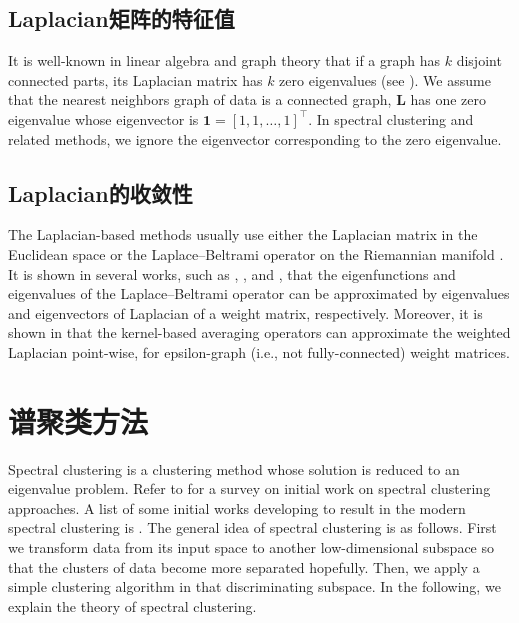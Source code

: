 \documentclass[lang=cn,10pt]{gorgeousnbook}
\numberwithin{equation}{section}%
\numberwithin{figure}{section}%
\begin{document}
\subsection{Laplacian矩阵的特征值}\label{section_eig_Laplacian}

It is well-known in linear algebra and graph theory that if a graph has $k$ disjoint connected parts, its Laplacian matrix has $k$ zero eigenvalues (see \cite{polito2002grouping,ahmadizadeh2017eigenvalues}).
We assume that the nearest neighbors graph of data is a connected graph, $\boldsymbol{L}$ has one zero eigenvalue whose eigenvector is $\boldsymbol{1} = [1, 1, \dots, 1]^\top$. In spectral clustering and related methods, we ignore the eigenvector corresponding to the zero eigenvalue. 

\subsection{Laplacian的收敛性}

The Laplacian-based methods usually use either the Laplacian matrix in the Euclidean space or the Laplace--Beltrami operator on the Riemannian manifold \cite{hein2005graphs}. 
It is shown in several works, such as \cite{burago2015graph}, \cite{trillos2020error}, and \cite{dunson2021spectral}, that the eigenfunctions and eigenvalues of the Laplace--Beltrami operator can be approximated by eigenvalues and eigenvectors of Laplacian of a weight matrix, respectively. 
Moreover, it is shown in \cite{hein2005graphs,hein2007graph} that the kernel-based averaging operators can approximate the weighted Laplacian point-wise, for epsilon-graph (i.e., not fully-connected) weight matrices. 

\section{谱聚类方法}\label{section_spectral_clustering}

Spectral clustering \cite{weiss1999segmentation,ng2001spectral} is a clustering method whose solution is reduced to an eigenvalue problem. Refer to \cite{weiss1999segmentation} for a survey on initial work on spectral clustering approaches. A list of some initial works developing to result in the modern spectral clustering is \cite{scott1990feature,costeira1995multi,perona1998factorization,shi1997normalized,shi2000normalized}.
The general idea of spectral clustering is as follows. First we transform data from its input space to another low-dimensional subspace so that the clusters of data become more separated hopefully. Then, we apply a simple clustering algorithm in that discriminating subspace. In the following, we explain the theory of spectral clustering. 
\end{document}
